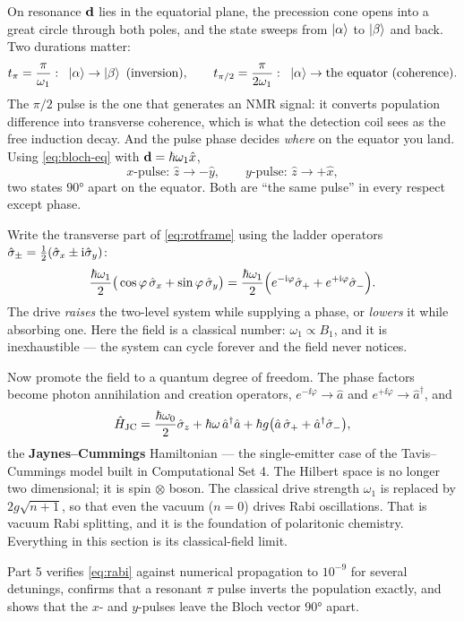 On resonance $\mathbf{d}$ lies in the equatorial plane, the precession cone opens into a
great circle through both poles, and the state sweeps from $\ket{\alpha}$ to
$\ket{\beta}$ and back. Two durations matter:
%
\begin{equation}
t_\pi = \frac{\pi}{\omega_1}: \;\; \ket{\alpha}\to\ket{\beta} \text{ (inversion)},
\qquad
t_{\pi/2} = \frac{\pi}{2\omega_1}: \;\; \ket{\alpha}\to \text{the equator (coherence)}.
\end{equation}
%
The $\pi/2$ pulse is the one that generates an NMR signal: it converts population
difference into transverse coherence, which is what the detection coil sees as the free
induction decay. And the pulse phase decides \emph{where} on the equator you land. Using
\cref{eq:bloch-eq} with $\mathbf{d} = \hbar\omega_1\hat{x}$,
%
\begin{equation}
\text{$x$-pulse: } \hat{z}\to-\hat{y},
\qquad
\text{$y$-pulse: } \hat{z}\to+\hat{x},
\end{equation}
%
two states $\ang{90}$ apart on the equator. Both are ``the same pulse'' in every respect
except phase.

\begin{lookahead}
Write the transverse part of \cref{eq:rotframe} using the ladder operators
$\hat\sigma_\pm = \tfrac{1}{2}(\hat{\sigma}_x\pm\mathrm{i}\hat{\sigma}_y)$:
\begin{equation}
\frac{\hbar\omega_1}{2}\big(\cos\varphi\,\hat{\sigma}_x+\sin\varphi\,\hat{\sigma}_y\big)
 = \frac{\hbar\omega_1}{2}\Big(e^{-\mathrm{i}\varphi}\hat\sigma_+ + e^{+\mathrm{i}\varphi}\hat\sigma_-\Big).
\end{equation}
The drive \emph{raises} the two-level system while supplying a phase, or \emph{lowers} it
while absorbing one. Here the field is a classical number: $\omega_1\propto B_1$, and it
is inexhaustible --- the system can cycle forever and the field never notices.

Now promote the field to a quantum degree of freedom. The phase factors become photon
annihilation and creation operators, $e^{-\ii\varphi}\to\hat{a}$ and
$e^{+\ii\varphi}\to\hat{a}^\dagger$, and
\begin{equation}
\hat{H}_{\rm JC} = \frac{\hbar\omega_0}{2}\hat{\sigma}_z + \hbar\omega\,\hat{a}^\dagger\hat{a}
  + \hbar g\big(\hat{a}\,\hat\sigma_+ + \hat{a}^\dagger\hat\sigma_-\big),
\label{eq:jc}
\end{equation}
the \textbf{Jaynes--Cummings} Hamiltonian \cite{JaynesCummings} --- the single-emitter
case of the Tavis--Cummings model built in Computational Set 4. The Hilbert space is no
longer two dimensional; it is spin $\otimes$ boson. The classical drive strength
$\omega_1$ is replaced by $2g\sqrt{n+1}$, so that even the vacuum ($n=0$) drives Rabi
oscillations. That is vacuum Rabi splitting, and it is the foundation of polaritonic
chemistry. Everything in this section is its classical-field limit.
\end{lookahead}

\begin{nbbox}
Part 5 verifies \cref{eq:rabi} against numerical propagation to $10^{-9}$ for several
detunings, confirms that a resonant $\pi$ pulse inverts the population exactly, and
shows that the $x$- and $y$-pulses leave the Bloch vector $\ang{90}$ apart.
\end{nbbox}
